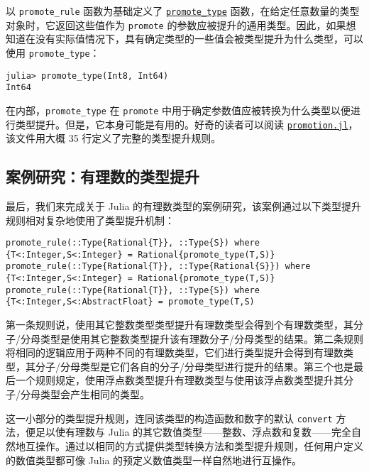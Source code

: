 以 \texttt{promote\_rule} 函数为基础定义了 \hyperlink{15048881762587391286}{\texttt{promote\_type}} 函数，在给定任意数量的类型对象时，它返回这些值作为 \texttt{promote} 的参数应被提升的通用类型。因此，如果想知道在没有实际值情况下，具有确定类型的一些值会被类型提升为什么类型，可以使用 \texttt{promote\_type}：




\begin{verbatim}
julia> promote_type(Int8, Int64)
Int64
\end{verbatim}



在内部，\texttt{promote\_type} 在 \texttt{promote} 中用于确定参数值应被转换为什么类型以便进行类型提升。但是，它本身可能是有用的。好奇的读者可以阅读 \href{https://github.com/JuliaLang/julia/blob/master/base/promotion.jl}{\texttt{promotion.jl}}，该文件用大概 35 行定义了完整的类型提升规则。



\hypertarget{8231690970182763012}{}


\subsection{案例研究：有理数的类型提升}



最后，我们来完成关于 Julia 的有理数类型的案例研究，该案例通过以下类型提升规则相对复杂地使用了类型提升机制：




\begin{verbatim}
promote_rule(::Type{Rational{T}}, ::Type{S}) where {T<:Integer,S<:Integer} = Rational{promote_type(T,S)}
promote_rule(::Type{Rational{T}}, ::Type{Rational{S}}) where {T<:Integer,S<:Integer} = Rational{promote_type(T,S)}
promote_rule(::Type{Rational{T}}, ::Type{S}) where {T<:Integer,S<:AbstractFloat} = promote_type(T,S)
\end{verbatim}



第一条规则说，使用其它整数类型类型提升有理数类型会得到个有理数类型，其分子/分母类型是使用其它整数类型提升该有理数分子/分母类型的结果。第二条规则将相同的逻辑应用于两种不同的有理数类型，它们进行类型提升会得到有理数类型，其分子/分母类型是它们各自的分子/分母类型进行提升的结果。第三个也是最后一个规则规定，使用浮点数类型提升有理数类型与使用该浮点数类型提升其分子/分母类型会产生相同的类型。



这一小部分的类型提升规则，连同该类型的构造函数和数字的默认 \texttt{convert} 方法，便足以使有理数与 Julia 的其它数值类型——整数、浮点数和复数——完全自然地互操作。通过以相同的方式提供类型转换方法和类型提升规则，任何用户定义的数值类型都可像 Julia 的预定义数值类型一样自然地进行互操作。



